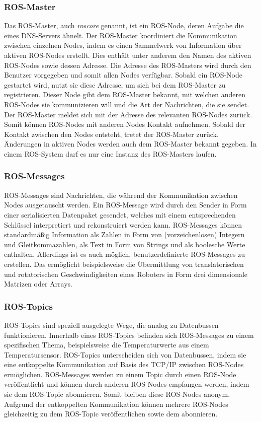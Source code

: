 \subsubsection{ROS-Master}
Das ROS-Master, auch \emph{roscore} genannt, ist ein ROS-Node, deren Aufgabe die eines DNS-Servers ähnelt. Der ROS-Master koordiniert die Kommunikation zwischen einzelnen Nodes, indem es einen Sammelwerk von Information über aktiven ROS-Nodes erstellt. Dies enthält unter anderem den Namen des aktiven ROS-Nodes sowie dessen Adresse. Die Adresse des ROS-Masters wird durch den Benutzer vorgegeben und somit allen Nodes verfügbar. Sobald ein ROS-Node gestartet wird, nutzt sie diese Adresse, um sich bei dem ROS-Master zu registrieren. Dieser Node gibt dem ROS-Master bekannt, mit welchen anderen ROS-Nodes sie kommunizieren will und die Art der Nachrichten, die sie sendet. Der ROS-Master meldet sich mit der Adresse des relevanten ROS-Nodes zurück. Somit können ROS-Nodes mit anderen Nodes Kontakt aufnehmen. Sobald der Kontakt zwischen den Nodes entsteht, tretet der ROS-Master zurück. Änderungen in aktiven Nodes werden auch dem ROS-Master bekannt gegeben. In einem ROS-System darf es nur eine Instanz des ROS-Masters laufen.  \autocite[11-12]{QuigleyROS2015} \autocite[6-7]{NewmanWyattS2018ASAt} \autocite[14]{LentinMasteringROS2021}

\subsubsection{ROS-Messages}
ROS-Messages sind Nachrichten, die während der Kommunikation zwischen Nodes ausgetauscht werden. Ein ROS-Message wird durch den Sender in Form einer serialisierten Datenpaket gesendet, welches mit einem entsprechenden Schlüssel interpretiert und rekonstruiert werden kann. ROS-Messages können standardmäßig Information als Zahlen in Form von (vorzeichenlosen) Integern und Gleitkommazahlen, als Text in Form von Strings und als boolesche Werte enthalten. Allerdings ist es auch möglich, benutzerdefinierte ROS-Messages zu erstellen. Das ermöglicht beispielsweise die Übermittlung von translatorischen und rotatorischen Geschwindigkeiten eines Roboters in Form drei dimensionale Matrizen oder Arrays. \autocite[6]{NewmanWyattS2018ASAt}

\subsubsection{ROS-Topics}
ROS-Topics sind speziell ausgelegte Wege, die analog zu Datenbussen funktionieren. Innerhalb eines ROS-Topics befinden sich ROS-Messages zu einem spezifischen Thema, beispielsweise die Temperaturwerte aus einem Temperatursensor. ROS-Topics unterscheiden sich von Datenbussen, indem sie eine entkoppelte Kommunikation auf Basis des TCP/IP zwischen ROS-Nodes ermöglichen. ROS-Messages werden zu einem Topic durch einen ROS-Node veröffentlicht und können durch anderen ROS-Nodes empfangen werden, indem sie dem ROS-Topic abonnieren. Somit bleiben diese ROS-Nodes anonym. Aufgrund der entkoppelten Kommunikation können mehrere ROS-Nodes gleichzeitig zu dem ROS-Topic veröffentlichen sowie dem abonnieren. \autocite[14]{LentinMasteringROS2021} \autocite[23]{LentinMasteringROS2018} \autocite[6]{NewmanWyattS2018ASAt}

